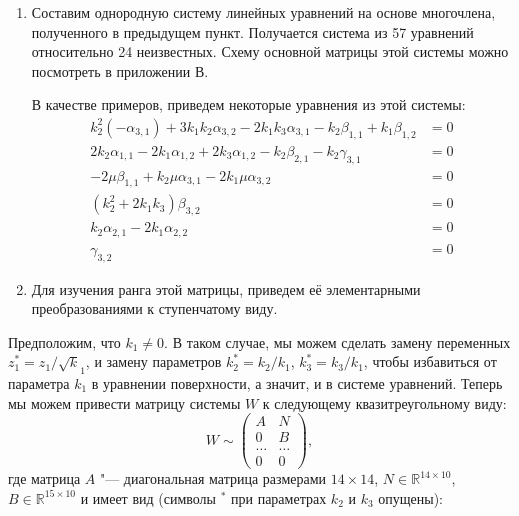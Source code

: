 \documentclass[../main.tex]{subfiles}
\begin{document}
\begin{enumerate}
\item Составим однородную систему линейных уравнений на основе многочлена, полученного в предыдущем пункт. Получается система из 57 уравнений относительно 24 неизвестных. Схему основной матрицы этой системы можно посмотреть в приложении В. 

В качестве примеров, приведем некоторые уравнения из этой системы:
\begin{equation}
\begin{aligned}
k_2^2 \left(-\alpha _{3,1}\right)+3 k_1 k_2 \alpha _{3,2}-2 k_1 k_3 \alpha _{3,1}-k_2 \beta _{1,1}+k_1 \beta _{1,2} &= 0 \\
2 k_2 \alpha _{1,1}-2 k_1 \alpha _{1,2}+2 k_3 \alpha _{1,2}-k_2 \beta _{2,1}-k_2 \gamma _{3,1} &=0 \\
-2 \mu  \beta _{1,1}+k_2 \mu  \alpha _{3,1}-2 k_1 \mu  \alpha _{3,2} &= 0 \\
\left(k_2^2 + 2 k_1 k_3\right) \beta _{3,2} &=0 \\ 
k_2 \alpha _{2,1}-2 k_1 \alpha _{2,2} &= 0 \\
\gamma_{3,2} &= 0
\end{aligned}
\end{equation}
\item Для изучения ранга этой матрицы, приведем её элементарными преобразованиями к ступенчатому виду.
\end{enumerate}

Предположим, что $k_1 \ne 0$. В таком случае, мы можем сделать замену переменных $z^*_1 = z_1
/ \sqrt k_1$, и замену параметров $k^*_2 = k_2 / k_1$, $k^*_3 = k_3 / k_1$, чтобы избавиться от параметра $k_1$ в уравнении поверхности, а значит, и в системе уравнений. Теперь мы можем привести матрицу системы $W$ к следующему квазитреугольному виду:
\begin{equation*}
W \sim
\begin{pmatrix}
A & N \\
0 & B \\
\hdots & \hdots  \\
0 & 0
\end{pmatrix},
\end{equation*}
где матрица $A$ "--- диагональная матрица размерами $14\times14$, $N\in \mathbb{R}^{14\times10}$, $B \in \mathbb{R}^{15\times10}$ и имеет вид (символы ${}^*$ при параметрах $k_2$ и $k_3$ опущены):
\end{document}
